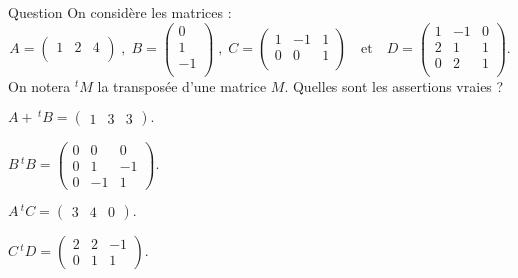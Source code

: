 \begin{multi}[multiple,feedback=
{On a :  \(A\,^tC=  
\left(\begin{array}{rc}3&4\end{array}\right).\)
}]{Question}
On considère les matrices : 
\[A=  \left(\begin{array}{rcc}1&2&4\\\end{array}\right) \; , \; 
B=    \left(\begin{array}{r}0\\1\\-1\\
\end{array}\right) \; , \;  C=\left(\begin{array}{rcc}
1&-1&1\\0&0&1\\
\end{array}\right) \quad  \mbox{et} \quad  D= \left(\begin{array}{rcc}1&-1&0\\2&1&1\\0&2&1\\
\end{array}\right).\]
On notera \(^tM\) la transposée d'une matrice \(M\). Quelles sont les assertions vraies ?

    \item* \(A+\, ^tB = \left(\begin{array}{rcc}
1&3&3\end{array}\right).\)
    \item* \(B\, ^tB=\left(\begin{array}{rccc}
0&0&0\\
0&1&-1\\
0&-1&1\end{array}\right).\)
    \item \(A\, ^tC= \left(\begin{array}{rcc}
3&4&0\end{array}\right).\)
    \item* \(C\, ^tD=
\left(\begin{array}{rcc}
2&2&-1\\
0&1&1\end{array}\right).\)
\end{multi}



